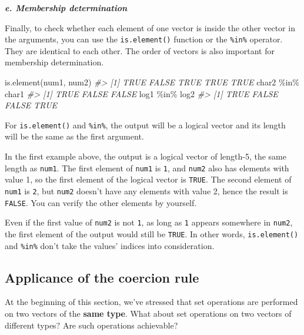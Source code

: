 \documentclass[
]{book}
\newenvironment{Shaded}{\begin{snugshade}}{\end{snugshade}}
\newcommand{\CommentTok}[1]{\textcolor[rgb]{0.56,0.35,0.01}{\textit{#1}}}
\newcommand{\FunctionTok}[1]{\textcolor[rgb]{0.00,0.00,0.00}{#1}}
\newcommand{\NormalTok}[1]{#1}
\newcommand{\SpecialCharTok}[1]{\textcolor[rgb]{0.00,0.00,0.00}{#1}}
\begin{document}
\textbf{\emph{e. Membership determination}}

Finally, to check whether each element of one vector is inside the other vector in the arguments, you can use the \texttt{is.element()} function or the \texttt{\%in\%} operator. They are identical to each other. The order of vectors is also important for membership determination.

\begin{Shaded}
\begin{Highlighting}[]
\FunctionTok{is.element}\NormalTok{(num1, num2)}
\CommentTok{\#\textgreater{} [1]  TRUE FALSE  TRUE  TRUE  TRUE}
\NormalTok{char2 }\SpecialCharTok{\%in\%}\NormalTok{ char1}
\CommentTok{\#\textgreater{} [1]  TRUE FALSE FALSE}
\NormalTok{log1 }\SpecialCharTok{\%in\%}\NormalTok{ log2}
\CommentTok{\#\textgreater{} [1]  TRUE FALSE FALSE  TRUE}
\end{Highlighting}
\end{Shaded}

For \texttt{is.element()} and \texttt{\%in\%}, the output will be a logical vector and its length will be the same as the first argument.

In the first example above, the output is a logical vector of length-5, the same length as \texttt{num1}. The first element of \texttt{num1} is \texttt{1}, and \texttt{num2} also has elements with value 1, so the first element of the logical vector is \texttt{TRUE}. The second element of \texttt{num1} is \texttt{2}, but \texttt{num2} doesn't have any elements with value 2, hence the result is \texttt{FALSE}. You can verify the other elements by yourself.

Even if the first value of \texttt{num2} is not \texttt{1}, as long as \texttt{1} appears somewhere in \texttt{num2}, the first element of the output would still be \texttt{TRUE}. In other words, \texttt{is.element()} and \texttt{\%in\%} don't take the values' indices into consideration.

\hypertarget{applicance-of-the-coercion-rule}{%
\subsection{Applicance of the coercion rule}\label{applicance-of-the-coercion-rule}}

At the beginning of this section, we've stressed that set operations are performed on two vectors of the \textbf{same type}. What about set operations on two vectors of different types? Are such operations achievable?
\end{document}
